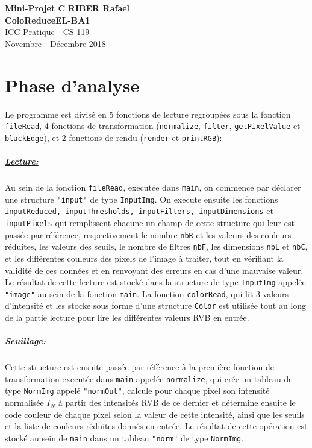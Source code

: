 \documentclass[a4paper, 11pt]{article}
\begin{document}
\noindent
\large\textbf{Mini-Projet C\raisebox{.5\height}{\scalebox{.5}{++}}} \hfill \textbf{RIBER Rafael} \\
\large\textbf{ColoReduce}\hfill \textbf{EL-BA1}\\
\normalsize ICC Pratique - CS-119\\
\hfill Novembre - Décembre 2018

\section*{Phase d'analyse}
Le programme est divisé en 5 fonctions de lecture regroupées sous la fonction \texttt{fileRead}, 4 fonctions de transformation (\texttt{normalize}, \texttt{filter}, \texttt{getPixelValue} et \texttt{blackEdge}), et 2 fonctions de rendu (\texttt{render} et \texttt{printRGB}):
\subparagraph{\underline{\textit{Lecture:}}}
Au sein de la fonction \texttt{fileRead}, executée dans \texttt{main}, on commence par déclarer une structure \texttt{"input"} de type \texttt{InputImg}. On execute ensuite les fonctions \texttt{inputReduced, inputThresholds, inputFilters, inputDimensions} et \texttt{inputPixels} qui remplissent chacune un champ de cette structure qui leur est passée par référence, respectivement le nombre \texttt{nbR} et les valeurs des couleurs réduites, les valeurs des seuils, le nombre de filtres \texttt{nbF}, les dimensions \texttt{nbL} et \texttt{nbC}, et les différentes couleurs des pixels de l'image à traiter, tout en vérifiant la validité de ces données et en renvoyant des erreurs en cas d'une mauvaise valeur. Le résultat de cette lecture est stocké dans la structure de type \texttt{InputImg} appelée \texttt{"image"} au sein de la fonction \texttt{main}. La fonction \texttt{colorRead}, qui lit 3 valeurs d'intensité et les stocke sous forme d'une structure \texttt{Color} est utilisée tout au long de la partie lecture pour lire les différentes valeurs RVB en entrée.

\subparagraph{\underline{\textit{Seuillage:}}}
Cette structure est ensuite passée par référence à la première fonction de transformation executée dans \texttt{main} appelée \texttt{normalize}, qui crée un tableau de type \texttt{NormImg} appelé \texttt{"normOut"}, calcule pour chaque pixel son intensité normalisée $I_N$ à partir des intensités RVB de ce dernier et détermine ensuite le code couleur de chaque pixel selon la valeur de cette intensité, ainsi que les seuils et la liste de couleurs réduites donnés en entrée. Le résultat de cette opération est stocké au sein de \texttt{main} dans un tableau \texttt{"norm"} de type \texttt{NormImg}.
\end{document}
